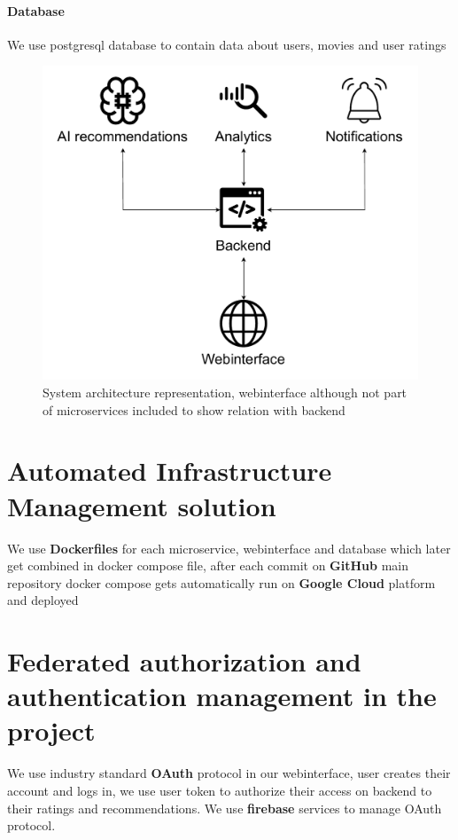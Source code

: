 \documentclass{article}[11pt]
\begin{document}
\paragraph{Database}
We use postgresql database to contain data about users, movies and user ratings


\begin{figure}[H]
    \caption{System architecture representation, webinterface although not part of microservices included to show relation with backend}
    \centering
\includegraphics[width=\textwidth]{images/systemArchitecture.drawio.pdf}
\end{figure}


\section{Automated Infrastructure Management solution}
We use \textbf{Dockerfiles}
for each microservice, webinterface and database which 
later get combined in docker compose file, after each commit on 
\textbf{GitHub} main repository docker compose gets automatically run 
on \textbf{Google Cloud} platform and deployed 
\section{Federated authorization and authentication management in the project}
We use industry standard \textbf{OAuth} protocol in our webinterface, 
user creates their account and logs in, we use user token to 
authorize their access on backend to their ratings and 
recommendations. We use \textbf{firebase} services to manage OAuth protocol.
\end{document}

